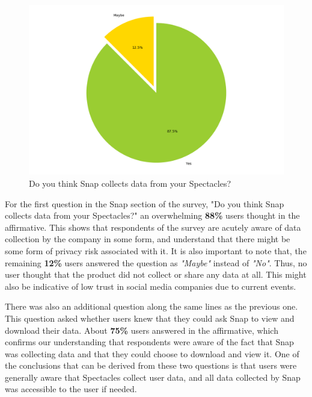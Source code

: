 \documentclass[sigconf]{acmart}
\begin{document}
\begin{figure}[h]
  \centering
  \includegraphics[width=\linewidth]{snap_data_collect.png}
  \caption{Do you think Snap collects data from your Spectacles?}
  \label{fig:snap_data_collect}
  \Description{}
\end{figure}

For the first question in the Snap section of the survey, "Do you think Snap collects data from your Spectacles?" an overwhelming \textbf{88\%} users thought in the affirmative. This shows that respondents of the survey are acutely aware of data collection by the company in some form, and understand that there might be some form of privacy risk associated with it. It is also important to note that, the remaining \textbf{12\%} users answered the question as \textit{"Maybe"} instead of \textit{"No"}. Thus, no user thought that the product did not collect or share any data at all. This might also be indicative of low trust in social media companies due to current events. 

There was also an additional question along the same lines as the previous one. This question asked whether users knew that they could ask Snap to view and download their data. About \textbf{75\%} users answered in the affirmative, which confirms our understanding that respondents were aware of the fact that Snap was collecting data and that they could choose to download and view it. One of the conclusions that can be derived from these two questions is that users were generally aware that Spectacles collect user data, and all data collected by Snap was accessible to the user if needed. 
\end{document}
